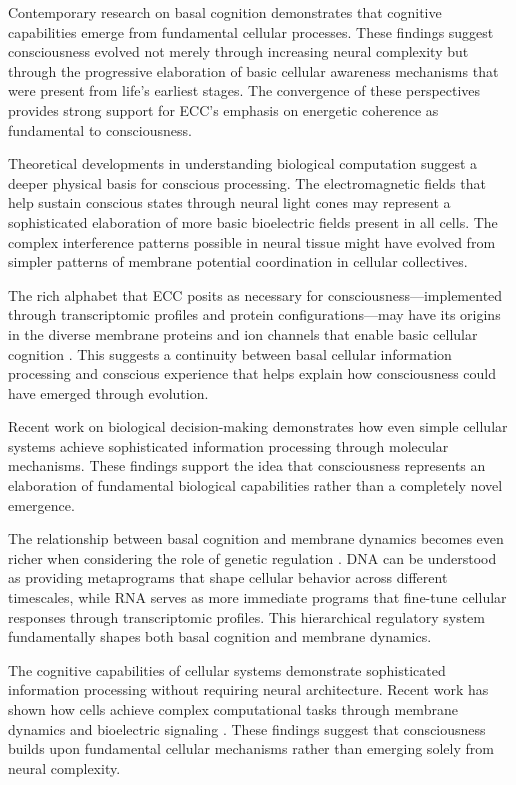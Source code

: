\begin{refsection}
Contemporary research on basal cognition \cite{Levin2019} demonstrates that cognitive capabilities emerge from fundamental cellular processes. These findings suggest consciousness evolved not merely through increasing neural complexity but through the progressive elaboration of basic cellular awareness mechanisms that were present from life's earliest stages. The convergence of these perspectives provides strong support for ECC's emphasis on energetic coherence as fundamental to consciousness.

Theoretical developments in understanding biological computation \cite{Levin2018} suggest a deeper physical basis for conscious processing. The electromagnetic fields that help sustain conscious states through neural light cones may represent a sophisticated elaboration of more basic bioelectric fields present in all cells. The complex interference patterns possible in neural tissue might have evolved from simpler patterns of membrane potential coordination in cellular collectives.

The rich alphabet that ECC posits as necessary for consciousness—implemented through transcriptomic profiles and protein configurations—may have its origins in the diverse membrane proteins and ion channels that enable basic cellular cognition \cite{Fields2020}. This suggests a continuity between basal cellular information processing and conscious experience that helps explain how consciousness could have emerged through evolution.

Recent work on biological decision-making \cite{Mitchell2016} demonstrates how even simple cellular systems achieve sophisticated information processing through molecular mechanisms. These findings support the idea that consciousness represents an elaboration of fundamental biological capabilities rather than a completely novel emergence.

The relationship between basal cognition and membrane dynamics becomes even richer when considering the role of genetic regulation \cite{Manicka2019}. DNA can be understood as providing metaprograms that shape cellular behavior across different timescales, while RNA serves as more immediate programs that fine-tune cellular responses through transcriptomic profiles. This hierarchical regulatory system fundamentally shapes both basal cognition and membrane dynamics.

The cognitive capabilities of cellular systems \cite{Lyon2015} demonstrate sophisticated information processing without requiring neural architecture. Recent work has shown how cells achieve complex computational tasks through membrane dynamics and bioelectric signaling \cite{Levin2018}. These findings suggest that consciousness builds upon fundamental cellular mechanisms rather than emerging solely from neural complexity.


\end{refsection}
